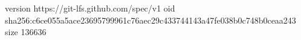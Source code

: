 version https://git-lfs.github.com/spec/v1
oid sha256:c6ce055a5ace23695799961c76aec29c433744143a47fe038b0c748b0ceaa243
size 136636
